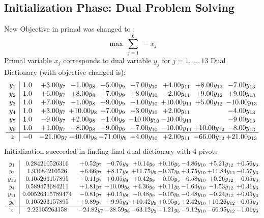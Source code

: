 \documentclass[9pt]{article}
\begin{document}
\subsection{Initialization Phase: Dual Problem Solving}
New Objective in primal was changed to : \[ \max\ \sum_{j=1}^{6}\ - x_j \] 
Primal variable $x_j$ corresponds to dual variable $y_j$ for $j = 1,\ldots,13$
Dual Dictionary (with objective changed is): 
\[\begin{array}{c| c c@{\hskip 2pt} c@{\hskip 2pt} c@{\hskip 2pt} c@{\hskip 2pt} c@{\hskip 2pt} c@{\hskip 2pt} c@{\hskip 2pt} }
 y_{1}   &  1.0 & +  3.00 y_{7} & -1.00 y_{8} & +  5.00 y_{9} & -7.00 y_{10} & +  4.00 y_{11} & +  8.00 y_{12} & -7.00 y_{13}\\
 y_{2}   &  1.0 & +  6.00 y_{7} & +  8.00 y_{8} & +  7.00 y_{9} & +  8.00 y_{10} & -2.00 y_{11} & +  9.00 y_{12} & +  9.00 y_{13}\\
 y_{3}   &  1.0 & +  7.00 y_{7} & -1.00 y_{8} & +  9.00 y_{9} & -1.00 y_{10} & + 10.00 y_{11} & +  5.00 y_{12} & -10.00 y_{13}\\
 y_{4}   &  1.0 & +  3.00 y_{7} & + 10.00 y_{8} & +  7.00 y_{9} & -3.00 y_{10} & +  2.00 y_{11} &   & -4.00 y_{13}\\
 y_{5}   &  1.0 & -9.00 y_{7} & +  2.00 y_{8} & -1.00 y_{9} & -10.00 y_{10} & -10.00 y_{11} &   & -9.00 y_{13}\\
 y_{6}   &  1.0 & +  1.00 y_{7} & -8.00 y_{8} & +  9.00 y_{9} & -7.00 y_{10} & -10.00 y_{11} & + 10.00 y_{12} & -8.00 y_{13}\\
\hline
z    &  -0 & -21.00 y_{7} & -40.00 y_{8} & -71.00 y_{9} & +  4.00 y_{10} & +  2.00 y_{11} & -66.00 y_{12} & + 21.00 y_{13}\\
\end{array}\]
Initialization succeeded in finding final dual dictionary with 4 pivots
\[\begin{array}{c| c c@{\hskip 2pt} c@{\hskip 2pt} c@{\hskip 2pt} c@{\hskip 2pt} c@{\hskip 2pt} c@{\hskip 2pt} c@{\hskip 2pt} }
 y_{1}   &  0.284210526316 & +  0.52 y_{7} & -0.76 y_{8} & +  0.14 y_{9} & +  0.16 y_{5} & -4.86 y_{10} & +  5.21 y_{12} & +  0.56 y_{3}\\
 y_{2}   &  1.93684210526 & +  6.66 y_{7} & +  8.17 y_{8} & + 11.75 y_{9} & -0.37 y_{5} & +  3.75 y_{10} & + 11.84 y_{12} & -0.57 y_{3}\\
 y_{13}   &  0.105263157895 & -0.11 y_{7} & +  0.05 y_{8} & +  0.42 y_{9} & -0.05 y_{5} & -0.58 y_{10} & +  0.26 y_{12} & -0.05 y_{3}\\
 y_{4}   &  0.589473684211 & +  1.81 y_{7} & + 10.09 y_{8} & +  4.36 y_{9} & +  0.11 y_{5} & -1.64 y_{10} & -1.53 y_{12} & +  0.31 y_{3}\\
 y_{11}   &  0.00526315789474 & -0.81 y_{7} & +  0.15 y_{8} & -0.48 y_{9} & -0.05 y_{5} & -0.48 y_{10} & -0.24 y_{12} & +  0.05 y_{3}\\
 y_{6}   &  0.105263157895 & +  9.89 y_{7} & -9.95 y_{8} & + 10.42 y_{9} & +  0.95 y_{5} & +  2.42 y_{10} & + 10.26 y_{12} & -0.05 y_{3}\\
\hline
z    &  2.22105263158 & -24.82 y_{7} & -38.59 y_{8} & -63.12 y_{9} & -1.21 y_{5} & -9.12 y_{10} & -60.95 y_{12} & -1.01 y_{3}\\
\end{array}\]
\end{document}

